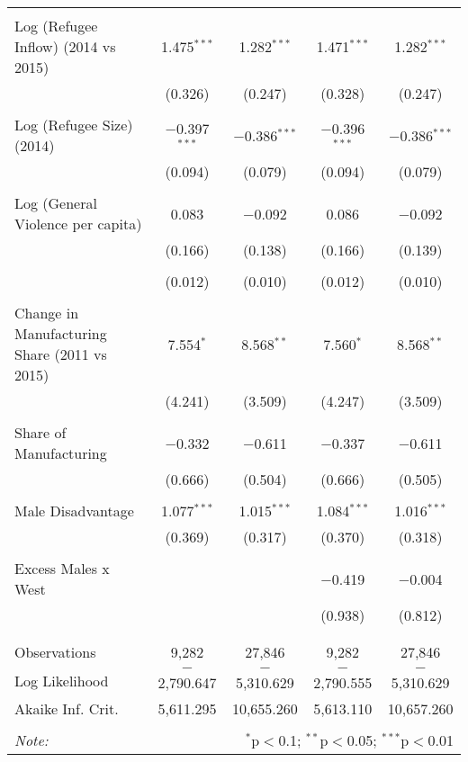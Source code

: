 \begin{table}[!htbp]
\begin{tabular}{@{\extracolsep{5pt}}lcccc}
  & & & & \\ 
 Log (Refugee Inflow) (2014 vs 2015) & 1.475$^{***}$ & 1.282$^{***}$ & 1.471$^{***}$ & 1.282$^{***}$ \\ 
  & (0.326) & (0.247) & (0.328) & (0.247) \\ 
  & & & & \\ 
 Log (Refugee Size) (2014) & $-$0.397$^{***}$ & $-$0.386$^{***}$ & $-$0.396$^{***}$ & $-$0.386$^{***}$ \\ 
  & (0.094) & (0.079) & (0.094) & (0.079) \\ 
  & & & & \\ 
 Log (General Violence per capita) & 0.083 & $-$0.092 & 0.086 & $-$0.092 \\ 
  & (0.166) & (0.138) & (0.166) & (0.139) \\ 
  & & & & \\ 
  & (0.012) & (0.010) & (0.012) & (0.010) \\ 
  & & & & \\ 
 Change in Manufacturing Share (2011 vs 2015) & 7.554$^{*}$ & 8.568$^{**}$ & 7.560$^{*}$ & 8.568$^{**}$ \\ 
  & (4.241) & (3.509) & (4.247) & (3.509) \\ 
  & & & & \\ 
 Share of Manufacturing & $-$0.332 & $-$0.611 & $-$0.337 & $-$0.611 \\ 
  & (0.666) & (0.504) & (0.666) & (0.505) \\ 
  & & & & \\ 
 Male Disadvantage & 1.077$^{***}$ & 1.015$^{***}$ & 1.084$^{***}$ & 1.016$^{***}$ \\ 
  & (0.369) & (0.317) & (0.370) & (0.318) \\ 
  & & & & \\ 
 Excess Males x West &  &  & $-$0.419 & $-$0.004 \\ 
  &  &  & (0.938) & (0.812) \\ 
  & & & & \\ 
\hline \\[-1.8ex] 
Observations & 9,282 & 27,846 & 9,282 & 27,846 \\ 
Log Likelihood & $-$2,790.647 & $-$5,310.629 & $-$2,790.555 & $-$5,310.629 \\ 
Akaike Inf. Crit. & 5,611.295 & 10,655.260 & 5,613.110 & 10,657.260 \\ 
\hline 
\hline \\[-1.8ex] 
\textit{Note:}  & \multicolumn{4}{r}{$^{*}$p$<$0.1; $^{**}$p$<$0.05; $^{***}$p$<$0.01} \\ 
\end{tabular} 
\end{table} 
